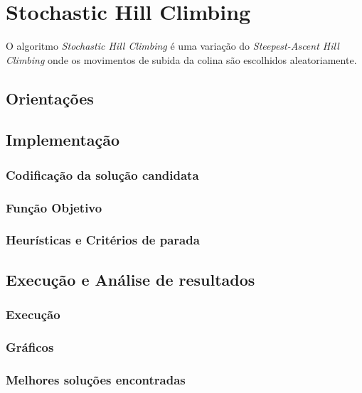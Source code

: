 \section{Stochastic Hill Climbing}

O algoritmo \textit{Stochastic Hill Climbing} é uma variação do \textit{Steepest-Ascent Hill Climbing} onde os movimentos de subida da colina são escolhidos aleatoriamente.

\subsection{Orientações}



\subsection{Implementação}

\subsubsection{Codificação da solução candidata}

\subsubsection{Função Objetivo}

\subsubsection{Heurísticas e Critérios de parada}



\subsection{Execução e Análise de resultados}

\subsubsection{Execução}

\subsubsection{Gráficos}

\subsubsection{Melhores soluções encontradas}